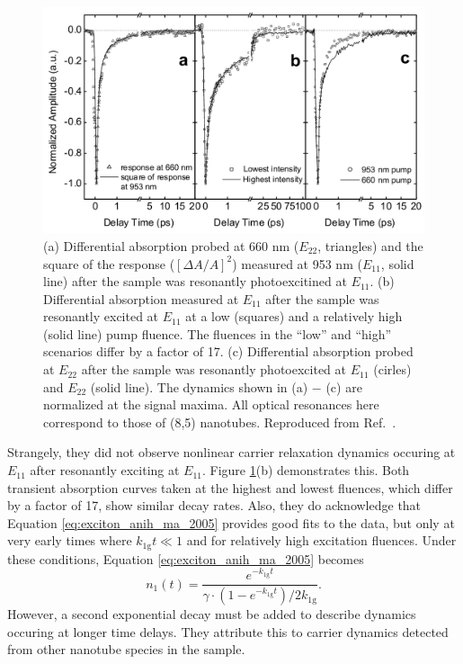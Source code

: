 \begin{figure}[H]
 \centering
 \includegraphics[scale=0.35]{images/chapter_prior_works/abs_ma_2005}
 \caption{(a) Differential absorption probed at 660 nm ($E_{22}$, triangles) and the square of the response ($[ \Delta A / A ]^2$) measured at 953 nm ($E_{11}$, solid line) after the sample was resonantly photoexcitined at $E_{11}$. (b) Differential absorption  measured at $E_{11}$ after the sample was resonantly excited at $E_{11}$ at a low (squares) and a relatively high (solid line) pump fluence. The fluences in the ``low'' and ``high'' scenarios differ by a factor of 17. (c) Differential absorption probed at $E_{22}$ after the sample was resonantly photoexcited at $E_{11}$ (cirles) and $E_{22}$ (solid line). The dynamics shown in (a) $-$ (c) are normalized at the signal maxima. All optical resonances here correspond to those of (8,5) nanotubes. Reproduced from Ref.\ \cite{ma2005femtosecond}.}
 \label{fig:abs_ma_2005}
\end{figure}

Strangely, they did not observe nonlinear carrier relaxation dynamics occuring at $E_{11}$ after resonantly exciting at $E_{11}$. Figure \ref{fig:abs_ma_2005}(b) demonstrates this. Both transient absorption curves taken at the highest and lowest fluences, which differ by a factor of 17, show similar decay rates. Also, they do acknowledge that Equation \eqref{eq:exciton_anih_ma_2005} provides good fits to the data, but only at very early times where $k_\text{1g} t \ll 1$ and for relatively high excitation fluences. Under these conditions, Equation \eqref{eq:exciton_anih_ma_2005} becomes
\begin{equation}
		n_1(t) = \frac{e^{-k_\text{1g}t}}{\gamma\cdot(1 - e^{-k_\text{1g}t} )/2k_\text{1g}}.
\end{equation}
However, a second exponential decay must be added to describe dynamics occuring at longer time delays. They attribute this to carrier dynamics detected from other nanotube species in the sample.

